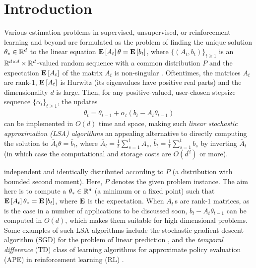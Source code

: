 \section{Introduction}\label{sec:intro}
Various estimation problems in supervised, unsupervised, or reinforcement learning and beyond
are formulated as the problem of finding the unique solution $\theta_*\in \mathbb{R}^d$ 
to the linear equation $\mathbf{E}\left[A_t\right] \theta = \mathbf{E}\left[b_t\right]$,
where $\{(A_t,b_t)\}_{t\ge 1}$ is an $\mathbb{R}^{d \times d}\times \mathbb{R}^d$-valued random sequence with a common distribution $P$
and the expectation $\mathbf{E}\left[A_t\right]$ of the matrix $A_t$ is non-singular \citep[e.g.,][]{bemepri90,LjPfWa92,SoKo94,degylu96,
sutton,konda-tsitsiklis,KoTsi03LSA,gtd,gtd2,gtdmp}.
Oftentimes, the matrices $A_t$ are rank-1, $\mathbf{E}\left[A_t\right]$ is Hurwitz (its eigenvalues have positive real parts)
and the dimensionality $d$ is large.
Then, for any positive-valued, user-chosen stepsize sequence $\{\alpha_t\}_{t\ge 1}$, the updates
\begin{align}\label{eq:lsaintro}
\theta_t=\theta_{t-1}+\alpha_t (b_t-A_t \theta_{t-1})
\end{align}
can be implemented in $O(d)$ time and space, making such 
\emph{linear stochastic approximation (LSA) algorithms} 
an appealing alternative to directly 
computing the solution to $\bar A_t \theta = \bar b_t$, where $\bar A_t = \frac1t\sum_{s=1}^t A_s$, $\bar b_t = \frac1t \sum_{s=1}^t b_s$ by inverting $\bar A_t$ (in which case the computational and storage costs are $O(d^2)$ or more).

independent and identically distributed according to $P$ (a distribution with bounded second moment). Here, $P$ denotes the given problem instance. The aim here is to compute a $\theta_*\in\mathbb{R}^d$ (a minimum or a fixed point) such that $\mathbf{E}\left[A_t\right]\theta_*=\mathbf{E}\left[b_t\right]$, where $\mathbf{E}$ is the expectation. When $A_t\,$s are rank-$1$ matrices, as is the case in a number of applications to be discussed soon, $b_t -A_t\theta_{t-1}$ can be computed in $O(d)$, which makes them suitable for high dimensional problems. Some examples of such LSA algorithms include the stochastic gradient descent algorithm (SGD) for the problem of linear prediction \cite{bach,bachaistats}, and the \emph{temporal difference} (TD) class of learning algorithms for approximate policy evaluation (APE) in reinforcement learning (RL) \cite{sutton,konda-tsitsiklis,KoTsi03LSA,gtd,gtd2,gtdmp}.
\fi

